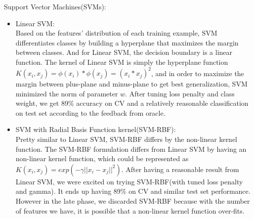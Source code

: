 
Support Vector Machines(SVMs):\\
\begin{itemize}
	\item Linear SVM:\\
	Based on the features' distribution of each training example, SVM differentiates classes by building a hyperplane that maximizes the margin between classes. And for Linear SVM, the decision boundary is a linear function. The kernel of Linear SVM is simply the hyperplane function $K(x_i,x_j) = \phi(x_i)*\phi(x_j) = (x_i*x_j)^2$, and in order to maximize the margin between plus-plane and minus-plane to get best generalization, SVM minimized the norm of parameter $w$\cite{b12}. After tuning loss penalty and class weight, we get 89\% accuracy on CV and a relatively reasonable classification on test set according to the feedback from oracle.\\
	\item SVM with Radial Basis Function kernel(SVM-RBF):\\
	Pretty similar to Linear SVM, SVM-RBF differs by the non-linear kernel function. The SVM-RBF formulation differs from Linear SVM by having an non-linear kernel function, which could be represented as $K(x_i,x_j) = exp(-\gamma||x_i - x_j ||^2)$\cite{b12}. After having a reasonable result from Linear SVM, we were excited on trying SVM-RBF(with tuned loss penalty and gamma). It ends up having 89\% on CV and similar test set performance. However in the late phase, we discarded SVM-RBF because with the number of features we have, it is possible that a non-linear kernel function over-fits. \\
\end{itemize}

